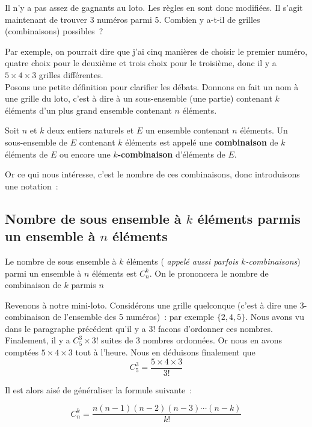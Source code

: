 \documentclass[french]{book}
\newcommand{\co}[2]{C_#2^#1}
\begin{document}
Il n'y a pas assez de gagnants au loto. Les règles en sont donc
modifiées. Il s'agit maintenant de trouver 3 numéros parmi 5.
Combien y a-t-il de grilles (combinaisons) possibles~?

Par exemple, on pourrait dire que j'ai cinq manières de choisir le
premier numéro, quatre choix pour le deuxième et trois choix pour
le troisième, donc il y a $5\times 4\times 3$ grilles différentes.\\

Posons une petite définition pour clarifier les débats. Donnons en
fait un nom à une grille du loto, c'est à dire à un sous-ensemble
(une partie) contenant $k$ éléments d'un plus grand ensemble
contenant $n$ éléments.

\begin{defn}[combinaison]
  Soit $n$ et $k$ deux entiers naturels et $E$ un ensemble contenant $n$ éléments. Un sous-ensemble de $E$ contenant $k$
éléments est appelé une \textbf{combinaison} de $k$ éléments de $E$ ou encore une $k$\textbf{-combinaison} d'éléments de
\unboldmath${E}$.
\end{defn}


Or ce qui nous intéresse, c'est le nombre de ces combinaisons,
donc introduisons une notation~:
\subsection{Nombre de sous ensemble à $k$ éléments parmis un ensemble à $n$ éléments}
\begin{defn}
   Le nombre de sous ensemble à $k$ éléments (\textit{ appelé aussi parfois $k$-combinaisons}) parmi un ensemble à $n$ éléments est $\co{k}{n}$. On le prononcera le nombre de combinaison de $k$ parmis $n$
  \vspace{3mm}
\end{defn}

Revenons à notre mini-loto. Considérons une grille quelconque
(c'est à dire une 3-combinaison de l'ensemble des 5 numéros)~: par
exemple $\{2,4,5\}$. Nous  avons vu dans le paragraphe précédent
qu'il y a $3!$ facons d'ordonner ces nombres. Finalement, il y a
$\co{3}{5} \times 3!$ suites de 3 nombres ordonnées. Or nous en
avons comptées $5\times 4\times 3$ tout à l'heure. Nous en
déduisons finalement que
$$\co{3}{5}  =\dfrac{5\times 4\times 3}{3!}$$

Il est alors aisé de généraliser la formule suivante~:


\begin{prop}[]
  $$\co{k}{n}=\dfrac{n(n-1)(n-2)(n-3)\cdots(n-k)}{k!}$$
\end{prop}
\end{document}
